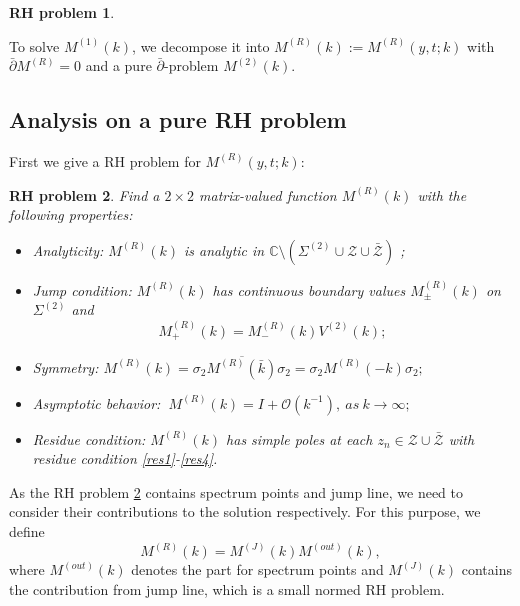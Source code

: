 \documentclass[11pt]{article}
\numberwithin{equation}{section}
\newtheorem{RHP}{RH problem}
\begin{document}
\begin{RHP}
\begin{itemize}
\end{itemize}
\end{RHP}
To solve $M^{(1)}(k)$,  we decompose it into $M^{(R)}(k):= M^{(R)}(y,t;k)$ with $\bar\partial M^{(R)}=0$ and a pure $\bar\partial$-problem $M^{(2)}(k)$.

\subsection{Analysis on a pure RH problem}\label{sec5.2}
First we give a RH problem for $M^{(R)}(y,t;k)$:

\begin{RHP}\label{rhp29}
    Find a $2\times 2$ matrix-valued function $M^{(R)}(k)$ with the following properties:
\begin{itemize}
  \item Analyticity: $M^{(R)}(k)$ is analytic in $\mathbb{C}\setminus(\Sigma^{(2)}\cup\mathcal{Z}\cup\bar{\mathcal{Z}})$ ;
  \item Jump condition: $M^{(R)}(k)$ has continuous boundary values $M^{(R)}_{\pm}(k)$ on $\Sigma^{(2)}$ and
 \begin{equation*}
M^{(R)}_{+}(k)=M^{(R)}_{-}(k)V^{(2)}(k);
\end{equation*}
\item Symmetry:
$M^{(R)}(k)=\sigma_2 \overline{ M^{(R)}(\bar{k})}\sigma_2=\sigma_2 M^{(R)}(-k)\sigma_2;$

  \item Asymptotic behavior:
  $\ M^{(R)}(k)=I+\mathcal{O}(k^{-1}),\ as \ k\to \infty;$

\item Residue condition: $M^{(R)}(k)$ has simple poles at each $z_n\in\mathcal{Z}\cup\bar{\mathcal{Z}}$ with residue condition \eqref{res1}-\eqref{res4}.
\end{itemize}
\end{RHP}

As the RH problem \ref{rhp29} contains spectrum points and jump line, we need to consider their contributions to the solution respectively. For this purpose, we define
\begin{equation}\label{eq73}
    M^{(R)}(k)=M^{(J)}(k)M^{(out)}(k),
\end{equation}
where $M^{(out)}(k)$ denotes the part for spectrum points and $M^{(J)}(k)$ contains the contribution from jump line, which is a small normed RH problem.
\end{document}
